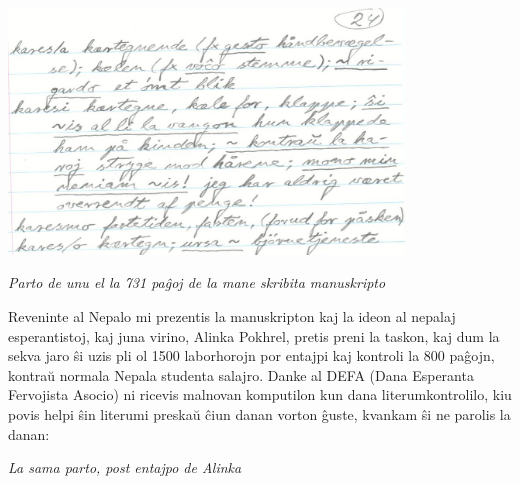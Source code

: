 \begin{center}
	\includegraphics[width=10.5cm]{origino.png}
	
	{\frenchspacing\itshape
	Parto de unu el la 731 pa\^goj de la mane skribita manuskripto}
	
\end{center}


{\frenchspacing
Reveninte al Nepalo mi prezentis la manuskripton kaj la ideon al nepalaj
esperantistoj, kaj juna virino, Alinka Pokhrel, pretis preni la taskon,
kaj dum la sekva jaro \^si uzis pli ol 1500 laborhorojn por entajpi kaj
kontroli la 800 pa\^gojn, kontra\u{u} normala Nepala studenta salajro.
Danke al DEFA (Dana Esperanta Fervojista Asocio) ni ricevis malnovan
komputilon kun dana literumkontrolilo, kiu povis helpi \^sin literumi
preska\u{u} \^ciun danan vorton \^guste, kvankam \^si ne parolis la
danan:}


\begin{center}

{\itshape La sama parto, post entajpo de Alinka}
\end{center}





